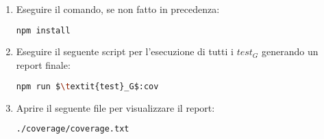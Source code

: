 \begin{enumerate}
\item Eseguire il comando, se non fatto in precedenza:
\begin{lstlisting}[language=bash]
npm install
\end{lstlisting}
\item Eseguire il seguente script per l'esecuzione di tutti i $\textit{test}_G$ generando un report finale:
\begin{lstlisting}[language=bash]
npm run $\textit{test}_G$:cov
\end{lstlisting}
\item Aprire il seguente file per visualizzare il report:
\begin{lstlisting}[language=bash]
./coverage/coverage.txt
\end{lstlisting}
\end{enumerate}